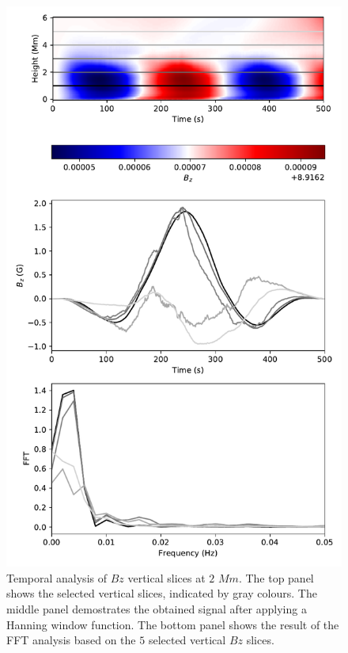 \documentclass[linenumbers]{aastex63}
\begin{document}
\begin{figure}
    \centering
    \label{fft_sim}
    \includegraphics[scale=0.55]{fft_sim.pdf}
    \caption{Temporal analysis of $Bz$ vertical slices at $2$ $Mm$. The top panel shows the selected vertical slices, indicated by gray colours. The middle panel demostrates the obtained signal after applying a Hanning window function. The bottom panel shows the result of the FFT analysis based on the $5$ selected vertical $Bz$ slices.}


\end{figure}
\end{document}
